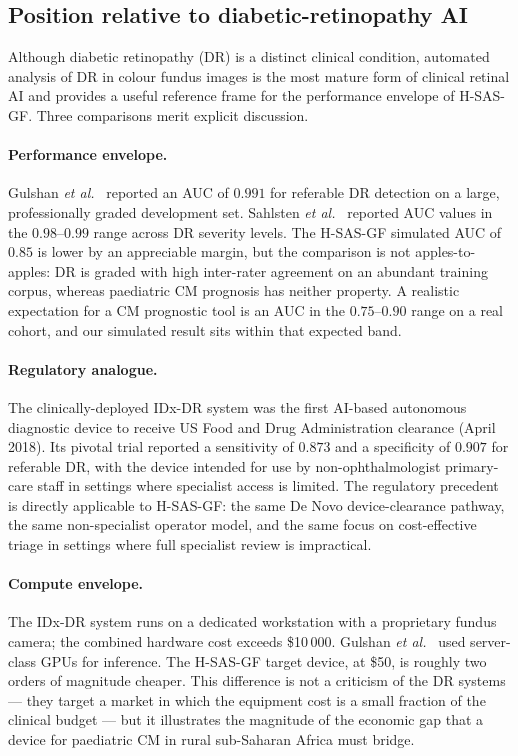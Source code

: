 \documentclass[twocolumn,10pt]{article}
\begin{document}
\subsection{Position relative to diabetic-retinopathy AI}
\label{sec:dr-context}
Although diabetic retinopathy (DR) is a distinct clinical
condition, automated analysis of DR in colour fundus images is
the most mature form of clinical retinal AI and provides a useful
reference frame for the performance envelope of H-SAS-GF. Three
comparisons merit explicit discussion.

\paragraph{Performance envelope.}
Gulshan \emph{et al.}\ \cite{Gulshan2016} reported an AUC of
$0.991$ for referable DR detection on a large, professionally
graded development set. Sahlsten \emph{et al.}\
\cite{Sahlsten2019} reported AUC values in the $0.98$--$0.99$
range across DR severity levels. The H-SAS-GF simulated AUC of
$0.85$ is lower by an appreciable margin, but the comparison is
not apples-to-apples: DR is graded with high inter-rater
agreement on an abundant training corpus, whereas paediatric CM
prognosis has neither property. A realistic expectation for a CM
prognostic tool is an AUC in the $0.75$--$0.90$ range on a real
cohort, and our simulated result sits within that expected
band.

\paragraph{Regulatory analogue.}
The clinically-deployed IDx-DR system
\cite{Abramoff2018IDx} was the first AI-based autonomous
diagnostic device to receive US Food and Drug Administration
clearance (April 2018). Its pivotal trial reported a sensitivity
of $0.873$ and a specificity of $0.907$ for referable DR, with
the device intended for use by non-ophthalmologist primary-care
staff in settings where specialist access is limited. The
regulatory precedent is directly applicable to H-SAS-GF: the
same De Novo device-clearance pathway, the same non-specialist
operator model, and the same focus on cost-effective triage in
settings where full specialist review is impractical.

\paragraph{Compute envelope.}
The IDx-DR system runs on a dedicated workstation with a
proprietary fundus camera; the combined hardware cost exceeds
\$10\,000. Gulshan \emph{et al.}\ \cite{Gulshan2016} used
server-class GPUs for inference. The H-SAS-GF target device, at
\$50, is roughly two orders of magnitude cheaper. This
difference is not a criticism of the DR systems --- they target
a market in which the equipment cost is a small fraction of the
clinical budget --- but it illustrates the magnitude of the
economic gap that a device for paediatric CM in rural
sub-Saharan Africa must bridge.
\end{document}
